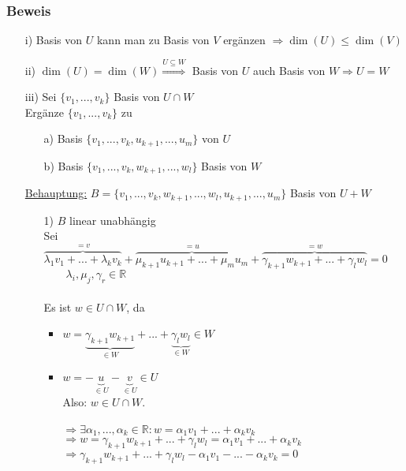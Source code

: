 \documentclass[12pt,titlepage, pdf]{article}
\newcommand{\R}{\mathds{R}}
\newcommand{\uline}[1]{\underline{#1}}
\renewcommand{\>}{\rightarrow}
\renewcommand{\*}{\cdot}
\begin{document}
\subsubsection*{Beweis}
\begin{itemize}
	\item[i)] Basis von $U$ kann man zu Basis von $V$ ergänzen $\Rightarrow \dim(U) \leq \dim(V)$
	\item[ii)] $\dim(U)= \dim(W) \overset{U\subseteq W}{\Rightarrow}$ Basis von $U$ auch Basis von $W \Rightarrow U = W$
	\item[iii)] Sei $\{v_1,...,v_k\}$ Basis von $U \cap W$ \\
	Ergänze $\{v_1,...,v_k\}$ zu 
	\begin{itemize}
		\item[a)] Basis $\{v_1,...,v_k, u_{k+1},...,u_m\}$ von $U$
		\item[b)] Basis $\{v_1,...,v_k,w_{k+1},...,w_l \}$ Basis von $W$
	\end{itemize}
	\uline{Behauptung:} $B = \{v_1,...,v_k,w_{k+1},...,w_l,u_{k+1},...,u_m\}$ Basis von $U+W$ \\
	\begin{itemize}
		\item[1)] $B$ linear unabhängig\\
		Sei\\
		$\overbrace{\lambda_1 v_1 + ...+ \lambda_k v_k}^{=v} + \overbrace{\mu_{k+1} u_{k+1} + ... + \mu_m u_m}^{=u} + \overbrace{\gamma_{k+1} w_{k+1} +... + \gamma_l w_l}^{=w} = 0$\\
		$ \qquad \lambda_i, \mu_j, \gamma_r \in \R$ \\
		\\
		Es ist $w \in U \cap W$, da
		\begin{itemize}
			\item $w = \underbrace{\gamma_{k+1} w_{k+1}}_{\in W} + ... + \underbrace{\gamma_l w_l}_{\in W} \in W $
			\item $w = -\underbrace{u}_{\in U}- \underbrace{v}_{\in U} \in U$ \\
			Also: $w \in U \cap W$.
			\\
			\\
			$\Rightarrow \exists \alpha_1,...,\alpha_k \in \R: w = \alpha_1 v_1 + ... + \alpha_k v_k$ \\
			$\Rightarrow w = \gamma_{k+1} w_{k+1} + ... + \gamma_l w_l = \alpha_1 v_1 + ... + \alpha_k v_k$ \\
			$\Rightarrow  \gamma_{k+1} w_{k+1} + ... + \gamma_l w_l - \alpha_1 v_1 - ... - \alpha_k v_k = 0$ \\

\end{itemize}
\end{itemize}
\end{itemize}
\end{document}
